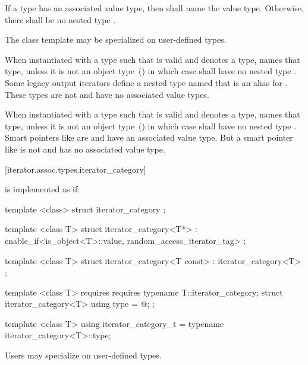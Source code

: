 \pnum
If a type  has an associated value type, then  shall name the
value type. Otherwise, there shall be no nested type .

\pnum
The  class template may be specialized on user-defined types.

\pnum
When instantiated with a type 
such that  is valid and denotes a type,
 names that type, unless it is not an object type~() in which case
 shall have no nested type . \enternote Some legacy output
iterators define a nested type named  that is an alias for . These
types are not  and have no associated value types.\exitnote

\pnum
When instantiated with a type 
such that  is valid and denotes a type,
 names that type, unless it is not an object type~() in which case
 shall have no nested type . \enternote Smart pointers like
 are  and have an associated value type. But a smart pointer
like  is not  and has no associated value type.\exitnote

[iterator.assoc.types.iterator_category]{}

\pnum
{}%
is implemented as if:

%
\begin{codeblock}
  template <class> struct iterator_category { };

  template <class T>
  struct iterator_category<T*>
    : enable_if<is_object<T>::value, random_access_iterator_tag> { };

  template <class T>
  struct iterator_category<T const> : iterator_category<T> { };

  template <class T>
    requires requires { typename T::iterator_category; }
  struct iterator_category<T> {
    using type = @\seebelow@;
  };

  template <class T> using iterator_category_t
    = typename iterator_category<T>::type;
\end{codeblock}

\pnum
Users may specialize  on user-defined types.

